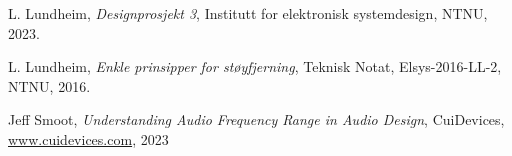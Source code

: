 
  L. Lundheim,
  \emph{Designprosjekt 3},
  Institutt for elektronisk systemdesign,
  NTNU,
  2023.

  L. Lundheim,
  \emph{Enkle prinsipper for støyfjerning},
  Teknisk Notat,
  Elsys-2016-LL-2,
  NTNU,
  2016.
  
  Jeff Smoot,
  \emph{Understanding Audio Frequency Range in Audio Design},
  CuiDevices,
  \href{https://www.cuidevices.com/blog/understanding-audio-frequency-range-in-audio-design}{www.cuidevices.com},
  2023



